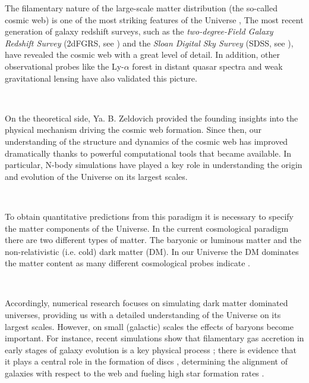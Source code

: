 \documentclass[a4,useAMS,usenatbib,usegraphicx,12pt]{article}
\begin{document}
The filamentary nature of the large-scale matter distribution (the so-called 
cosmic web) is one of the most striking features of the Universe \citep{Bond96}, 
The most recent generation of galaxy redshift surveys, such as the
\textit{two-degree-Field Galaxy  Redshift Survey} (2dFGRS, see
\citet{Colless03}) and the \textit{Sloan Digital  Sky Survey} (SDSS,
see \citet{Abazajian09}), have revealed the cosmic web with a great
level of detail. In addition, other observational probes like
the Ly-$\alpha$ forest in distant quasar spectra \citep{Rauch98, Cantalupo14} 
and weak gravitational lensing \citep{Massey07, Dietrich12} have also validated 
this picture.

\

On the theoretical side, Ya. B. Zeldovich \citep{Zeldovich70} provided
the founding insights into the physical mechanism driving the cosmic
web formation. Since then, our understanding of the structure and
dynamics of the cosmic web  has improved dramatically thanks to
powerful computational tools that became available. In  particular,
N-body simulations have played a key role in understanding the origin
and evolution of the Universe on its largest scales.

\

To obtain quantitative predictions from this paradigm it is necessary 
to specify the matter components of the Universe. In the current
cosmological paradigm there are two different types of matter. The
baryonic or luminous matter and the non-relativistic 
(i.e. cold) dark matter (DM). In our Universe the DM dominates the matter 
content as many different cosmological probes indicate \citep{Planck13XVI}. 

\

Accordingly, numerical research focuses on simulating dark matter
dominated universes, providing us with a detailed
understanding of the Universe on its largest scales. However, on small
(galactic) scales the effects of baryons become important. For instance,
recent simulations show that filamentary gas accretion in early stages
of galaxy evolution is a key physical process \citep{Dekel09}; there
is evidence that it plays a central role in the formation of discs
\citep{Dubois14}, determining the alignment of galaxies with respect
to the web \citep{Hahn10} and fueling high star formation rates
\citep{Dekel09}.  

\
\end{document}
